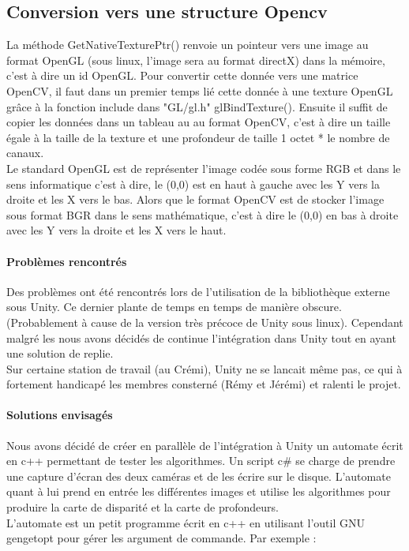 \documentclass[12pt,a4paper]{report}
\begin{document}
\subsection{Conversion vers une structure Opencv}
La méthode GetNativeTexturePtr() renvoie un pointeur vers une image au format OpenGL (sous linux, l'image sera au format directX) dans la mémoire, c'est à dire un id OpenGL. Pour convertir cette donnée vers une matrice OpenCV, il faut dans un premier temps lié cette donnée à une texture OpenGL grâce à la fonction include dans "GL/gl.h" glBindTexture(). Ensuite il suffit de copier les données dans un tableau au au format OpenCV, c'est à dire un taille égale à la taille de la texture et une profondeur de taille 1 octet * le nombre de canaux.\\
Le standard OpenGL est de représenter l'image codée sous forme RGB et dans le sens informatique c'est à dire, le (0,0) est en haut à gauche avec les Y vers la droite et les X vers le bas. Alors que le format OpenCV est de stocker l'image sous format BGR dans le sens mathématique, c'est à dire le (0,0) en bas à droite avec les Y vers la droite et les X vers le haut.

\paragraph{Problèmes rencontrés}
Des problèmes ont été rencontrés lors de l'utilisation de la bibliothèque externe sous Unity. Ce dernier plante de temps en temps de manière obscure. (Probablement à cause de la version très précoce de Unity sous linux). Cependant malgré les nous avons décidés de continue l'intégration dans Unity tout en ayant une solution de replie.\\
Sur certaine station de travail (au Crémi), Unity ne se lancait même pas, ce qui à fortement handicapé les membres consterné (Rémy et Jérémi) et ralenti le projet.

\paragraph{Solutions envisagés}
Nous avons décidé de créer en parallèle de l'intégration à Unity un automate écrit en c++ permettant de tester les algorithmes. Un script c\# se charge de prendre une capture d'écran des deux caméras et de les écrire sur le disque. L'automate quant à lui prend en entrée les différentes images et utilise les algorithmes pour produire la carte de disparité et la carte de profondeurs.\\
L'automate est un petit programme écrit en c++ en utilisant l'outil GNU gengetopt pour gérer les argument de commande. Par exemple :\\
\end{document}
